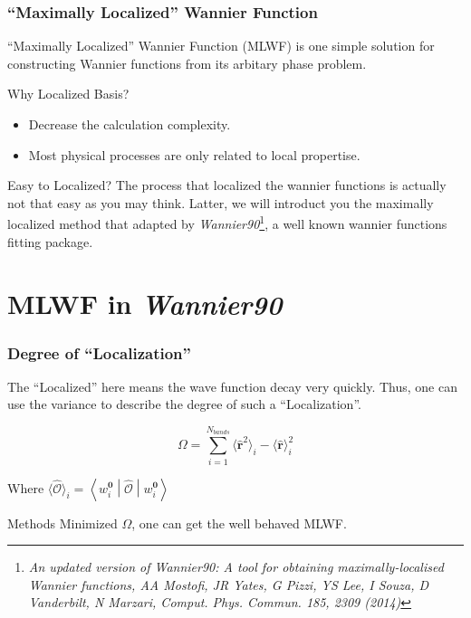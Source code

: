 \documentclass{beamer}
\begin{document}
  \begin{frame}
    \frametitle{``Maximally Localized'' Wannier Function}

    ``Maximally Localized'' Wannier Function (MLWF) is one simple solution for constructing Wannier functions from its arbitary phase problem.
    
    \begin{block}{Why Localized Basis?}
      \begin{itemize}
        \item Decrease the calculation complexity. 
        \item Most physical processes are only related to local propertise.
      \end{itemize}
    \end{block}

    \begin{block}{Easy to Localized?}
      The process that localized the wannier functions is actually not that easy as you may think. Latter, we will introduct you the maximally localized method that adapted by \emph{Wannier90}\footnote{\tiny\emph{An updated version of \emph{Wannier90}: A tool for obtaining maximally-localised Wannier functions, AA Mostofi, JR Yates, G Pizzi, YS Lee, I Souza, D Vanderbilt, N Marzari, Comput. Phys. Commun. 185, 2309 (2014) }}, a well known wannier functions fitting package.
    \end{block}

  \end{frame}

  \section{MLWF in \emph{Wannier90}}

  \begin{frame}
    \frametitle{Degree of ``Localization''}
    
    The ``Localized'' here means the wave function decay very quickly. Thus, one can use the variance to describe the degree of such a ``Localization''.

    \begin{equation}
        \Omega = \sum_{i=1}^{N_{bands}}\langle\widehat{\mathbf{r}}^2\rangle_i-\langle\widehat{\mathbf{r}}\rangle_i^2
    \end{equation}
    
    Where \(\langle\widehat{\mathcal{O}}\rangle_i = \left\langle{}w_i^\mathbf{0}\middle|\widehat{\mathcal{O}}\middle|w_i^\mathbf{0}\right\rangle\)
    \begin{block}{Methods}
      Minimized \(\Omega\), one can get the well behaved MLWF. 
    \end{block}
    
  \end{frame}
\end{document}
